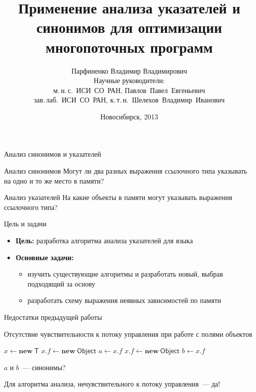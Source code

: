 \documentclass[usenames,dvipsnames,pdftex,unicode,hidelinks]{beamer}
\title[Анализ указателей и синонимов]{
  Применение анализа указателей и синонимов
  для оптимизации многопоточных программ
}
\author[Парфиненко Владимир Владимирович]{
  Парфиненко Владимир Владимирович
  \texorpdfstring{%
    \\
    \vspace{0.5cm}
    \small
      Научные руководители:\\
      м.\,н.\,с.~ИСИ~СО~РАН, Павлов~Павел~Евгеньевич \\
      зав.\,лаб.~ИСИ~СО~РАН, к.\,т.\,н.~Шелехов~Владимир~Иванович
  }{}%
}
\institute{
  Новосибирский Государственный Университет
}
\date{
  Новосибирск, 2013\ifdraft{ \\\medskip \footnotesize Git date: \GitDate.}{}
}
\newcommand{\java}{\eng{Java}\xspace}
\newcommand{\type}[1]{\mathsf{#1}}
\newcommand{\op}[1]{\mathbf{#1}}
\begin{document}
\begin{frame}
  \titlepage
\end{frame}

\begin{frame}{Анализ синонимов и указателей}

  \begin{block}{Анализ синонимов }
    Могут ли два разных выражения ссылочного типа указывать на одно и то же
    место в памяти?
  \end{block}

  \begin{block}{Анализ указателей }
    На какие объекты в памяти могут указывать выражения ссылочного типа?
  \end{block}

\end{frame}

\begin{frame}{Цель и задачи}

  \begin{itemize}
    \item \textbf{Цель:}
          разработка алгоритма анализа указателей для языка \java
    \medskip
    \item \textbf{Основные задачи:}
      \begin{itemize}
        \item изучить существующие алгоритмы и разработать новый, выбрав
              подходящий за основу
        \item разработать схему выражения неявных зависимостей по памяти
      \end{itemize}
  \end{itemize}

\end{frame}

\begin{frame}{Недостатки предыдущей работы}

  \begin{block}{Отсутствие чувствительности к потоку управления при работе с
      полями объектов}
    \begin{algorithmic}[1]
      \State $x \gets \op{new}~\type{T}$
      \State $x.f \gets \op{new}~\type{Object}$
      \State $a \gets x.f$
      \State $x.f \gets \op{new}~\type{Object}$
      \State $b \gets x.f$
    \end{algorithmic}
  \end{block}

  \medskip
  \centerline{\large $a$ и $b$~--- синонимы?}
  \centerline{Для алгоритма анализа, нечувствительного к потоку управления~---
  да!}

\end{frame}
\end{document}
